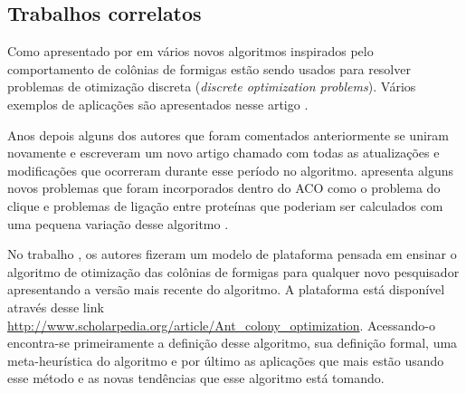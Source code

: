 \subsection{Trabalhos correlatos}

Como apresentado por \citeauthor{ACO_New_Algorithm} em  vários
novos algoritmos inspirados pelo comportamento de colônias de formigas estão sendo usados 
para resolver problemas de otimização discreta (\emph{discrete optimization problems}). Vários
exemplos de aplicações são apresentados nesse artigo \cite{ACO_New_Algorithm}.

Anos depois alguns dos autores que foram comentados anteriormente se uniram novamente e
escreveram um novo artigo chamado  com todas as atualizações 
e modificações que ocorreram durante esse período no algoritmo. \citeauthor{UpdatesInACO} apresenta
alguns novos problemas que foram incorporados dentro do ACO como o problema do clique e problemas
de ligação entre proteínas que poderiam ser calculados com uma pequena variação desse algoritmo
\cite{UpdatesInACO}.

No trabalho , os autores \citeauthor{ACO_New_Algorithm_20anos}
fizeram um modelo de plataforma pensada em ensinar o algoritmo de otimização das colônias de formigas 
para qualquer novo pesquisador apresentando a versão mais recente do algoritmo. A plataforma 
está disponível através desse link \url{http://www.scholarpedia.org/article/Ant_colony_optimization}.
Acessando-o encontra-se primeiramente a definição desse algoritmo, sua definição formal, uma meta-heurística
do algoritmo e por último as aplicações que mais estão usando esse método e as novas tendências que 
esse algoritmo está tomando.
